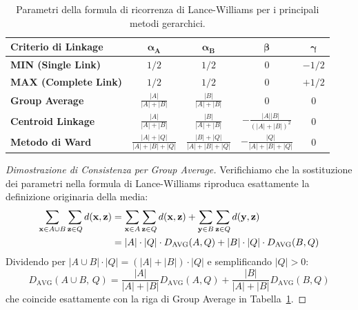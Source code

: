 \begin{table}[htbp]
\centering
\footnotesize
\setlength{\tabcolsep}{4pt}
\renewcommand{\arraystretch}{1.25}
\begin{tabular}{l c c c c}
\toprule
\textbf{Criterio di Linkage} & $\mathbf{\alpha_A}$ & $\mathbf{\alpha_B}$ & $\mathbf{\beta}$ & $\mathbf{\gamma}$ \\
\midrule
\textbf{MIN (Single Link)} & $1/2$ & $1/2$ & $0$ & $-1/2$ \\
\textbf{MAX (Complete Link)} & $1/2$ & $1/2$ & $0$ & $+1/2$ \\
\textbf{Group Average} & $\frac{|A|}{|A| + |B|}$ & $\frac{|B|}{|A| + |B|}$ & $0$ & $0$ \\[3pt]
\textbf{Centroid Linkage} & $\frac{|A|}{|A| + |B|}$ & $\frac{|B|}{|A| + |B|}$ & $-\frac{|A||B|}{(|A| + |B|)^2}$ & $0$ \\[3pt]
\textbf{Metodo di Ward} & $\frac{|A| + |Q|}{|A| + |B| + |Q|}$ & $\frac{|B| + |Q|}{|A| + |B| + |Q|}$ & $-\frac{|Q|}{|A| + |B| + |Q|}$ & $0$ \\
\bottomrule
\end{tabular}
\caption{Parametri della formula di ricorrenza di Lance-Williams per i principali metodi gerarchici.}
\label{tab:dm-lance-williams-parameters}
\end{table}

\begin{proof}[Dimostrazione di Consistenza per Group Average]
Verifichiamo che la sostituzione dei parametri nella formula di Lance-Williams riproduca esattamente la definizione originaria della media:
\begin{align}
    \sum_{\mathbf{x} \in A \cup B} \sum_{\mathbf{z} \in Q} d(\mathbf{x}, \mathbf{z}) &= \sum_{\mathbf{x} \in A} \sum_{\mathbf{z} \in Q} d(\mathbf{x}, \mathbf{z}) + \sum_{\mathbf{y} \in B} \sum_{\mathbf{z} \in Q} d(\mathbf{y}, \mathbf{z}) \notag \\
    &= |A| \cdot |Q| \cdot D_{\text{AVG}}(A, Q) + |B| \cdot |Q| \cdot D_{\text{AVG}}(B, Q)
\end{align}
Dividendo per $|A \cup B| \cdot |Q| = (|A| + |B|) \cdot |Q|$ e semplificando $|Q| > 0$:
\begin{equation}
    D_{\text{AVG}}(A \cup B, \, Q) = \frac{|A|}{|A| + |B|} D_{\text{AVG}}(A, Q) + \frac{|B|}{|A| + |B|} D_{\text{AVG}}(B, Q)
\end{equation}
che coincide esattamente con la riga di Group Average in Tabella~\ref{tab:dm-lance-williams-parameters}.
\end{proof}

